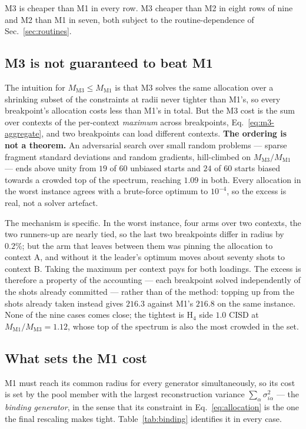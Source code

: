 \documentclass[10pt]{article}
\begin{document}
M3 is cheaper than M1 in every row. M3 cheaper than M2 in eight rows of nine and
M2 than M1 in seven, both subject to the routine-dependence of
Sec.~\ref{sec:routines}.

\subsection{M3 is not guaranteed to beat M1}
\label{sec:m3-m1}

The intuition for $M_{\mathrm{M3}}\le M_{\mathrm{M1}}$ is that M3 solves the same
allocation over a shrinking subset of the constraints at radii never tighter than
M1's, so every breakpoint's allocation costs less than M1's in total. But the M3
cost is the sum over contexts of the per-context \emph{maximum} across breakpoints,
Eq.~\eqref{eq:m3-aggregate}, and two breakpoints can load different contexts.
\textbf{The ordering is not a theorem.} An adversarial search over small random
problems --- sparse fragment standard deviations and random gradients, hill-climbed
on $M_{\mathrm{M3}}/M_{\mathrm{M1}}$ --- ends above unity from $19$ of $60$
unbiased starts and $24$ of $60$ starts biased towards a crowded top of the
spectrum, reaching $1.09$ in both. Every allocation in the worst instance agrees
with a brute-force optimum to $10^{-4}$, so the excess is real, not a solver
artefact.

The mechanism is specific. In the worst instance, four arms over two contexts, the
two runners-up are nearly tied, so the last two breakpoints differ in radius by
$0.2\%$; but the arm that leaves between them was pinning the allocation to
context A, and without it the leader's optimum moves about seventy shots to
context B. Taking the maximum per context pays for both loadings. The excess is
therefore a property of the accounting --- each breakpoint solved independently of
the shots already committed --- rather than of the method: topping up from the
shots already taken instead gives $216.3$ against M1's $216.8$ on the same
instance. None of the nine cases comes close; the tightest is H$_4$ side $1.0$
CISD at $M_{\mathrm{M1}}/M_{\mathrm{M3}}=1.12$, whose top of the spectrum is also
the most crowded in the set.

\subsection{What sets the M1 cost}
\label{sec:m1-cost}

M1 must reach its common radius for every generator simultaneously, so its cost is set by the pool member with the largest reconstruction variance $\sum_\alpha\sigma_{i\alpha}^2$ --- the \emph{binding generator}, in the sense that its constraint in Eq.~\eqref{eq:allocation} is the one the final rescaling makes tight. Table~\ref{tab:binding} identifies it in every case.
\end{document}
